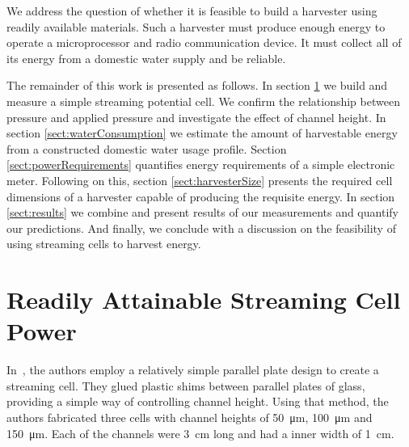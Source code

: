 \documentclass[10pt,final,journal]{IEEEtran}
\begin{document}

    We address the question of whether it is feasible to build a harvester using readily available materials.
    Such a harvester must produce enough energy to operate a microprocessor and radio communication device.
    It must collect all of its energy from a domestic water supply and be reliable.

    The remainder of this work is presented as follows.
    In section \ref{sect:streamingCell} we build and measure a simple streaming potential cell.
    We confirm the relationship between pressure and applied pressure and investigate the effect of channel height.
    In section \ref{sect:waterConsumption} we estimate the amount of harvestable energy from a constructed domestic water usage profile.
    Section \ref{sect:powerRequirements} quantifies energy requirements of a simple electronic meter.
    Following on this, section \ref{sect:harvesterSize} presents the required cell dimensions of a harvester capable of producing the requisite energy.
    In section \ref{sect:results} we combine and present results of our measurements and quantify our predictions.
    And finally, we conclude with a discussion on the feasibility of using streaming cells to harvest energy.

    \section{Readily Attainable Streaming Cell Power} \label{sect:streamingCell}
    In~\cite{Gu2000}, the authors employ a relatively simple parallel plate design to create a streaming cell.
    They glued plastic shims between parallel plates of glass, providing a simple way of controlling channel height.
    Using that method, the authors fabricated three cells with channel heights of \SI{50}{\micro\metre}, \SI{100}{\micro\metre} and \SI{150}{\micro\metre}.
    Each of the channels were \SI{3}{\centi\metre} long and had a inner width of \SI{1}{\centi\metre}.
\end{document}
